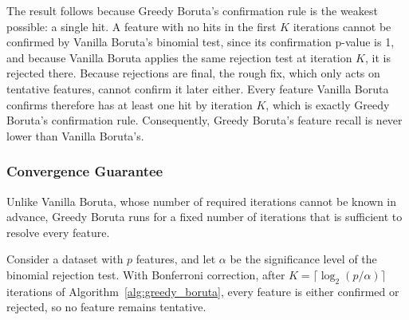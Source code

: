 \documentclass[runningheads]{llncs}
\begin{document}
The result follows because Greedy Boruta's confirmation rule is the weakest possible: a single hit. A feature with no hits in the first $K$ iterations cannot be confirmed by Vanilla Boruta's binomial test, since its confirmation p-value is 1, and because Vanilla Boruta applies the same rejection test at iteration $K$, it is rejected there. Because rejections are final, the rough fix, which only acts on tentative features, cannot confirm it later either. Every feature Vanilla Boruta confirms therefore has at least one hit by iteration $K$, which is exactly Greedy Boruta's confirmation rule. Consequently, Greedy Boruta's feature recall is never lower than Vanilla Boruta's.


\subsubsection{Convergence Guarantee}

Unlike Vanilla Boruta, whose number of required iterations cannot be known in advance, Greedy Boruta runs for a fixed number of iterations that is sufficient to resolve every feature.

\begin{theorem}
\label{thm:convergence}
Consider a dataset with $p$ features, and let $\alpha$ be the significance level of the binomial rejection test. With Bonferroni correction, after $K = \lceil \log_2(p/\alpha) \rceil$ iterations of Algorithm~\ref{alg:greedy_boruta}, every feature is either confirmed or rejected, so no feature remains tentative.
\end{theorem}
\end{document}
